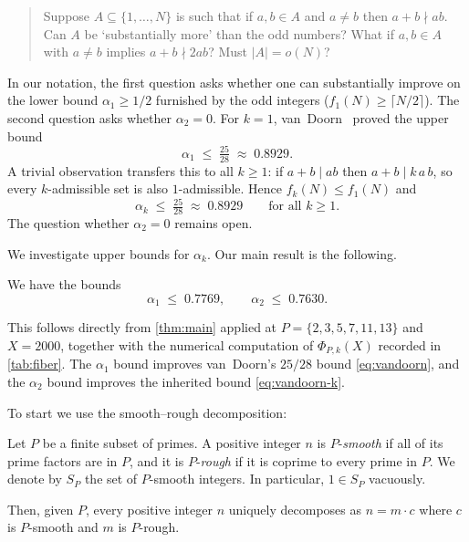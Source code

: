 \documentclass{amsart}
\begin{document}
\begin{quote}
Suppose $A \subseteq \{1, \ldots, N\}$ is such that if $a, b \in A$ and
$a \neq b$ then $a + b \nmid ab$. Can $A$ be `substantially more' than
the odd numbers? What if $a, b \in A$ with $a \neq b$ implies
$a + b \nmid 2ab$? Must $|A| = o(N)$?
\end{quote}

In our notation, the first question asks whether one can substantially improve on the lower bound $\alpha_1 \geq 1/2$ furnished by the odd integers ($f_1(N) \geq \lceil N/2 \rceil$). The second question asks whether $\alpha_2 = 0$.
For $k = 1$, van~Doorn~\cite{vanDoorn} proved the upper bound
\begin{equation}\label{eq:vandoorn}
\alpha_1 \;\leq\; \tfrac{25}{28} \;\approx\; 0.8929.
\end{equation}
A trivial observation transfers this to all $k \geq 1$: if $a + b \mid ab$ then $a + b \mid k\,a\,b$, so every $k$-admissible set is also $1$-admissible. Hence $f_k(N) \leq f_1(N)$ and
\begin{equation}\label{eq:vandoorn-k}
\alpha_k \;\leq\; \tfrac{25}{28} \;\approx\; 0.8929 \qquad \text{for all } k \geq 1.
\end{equation}
The question whether $\alpha_2 = 0$ remains open.

We investigate upper bounds for $\alpha_k$. Our main result is the following.

\begin{theorem}\label{thm:A} We have the bounds
\[
\alpha_1 \;\leq\; 0.7769, \qquad \alpha_2 \;\leq\; 0.7630.
\]
\end{theorem}
This follows directly from \cref{thm:main} applied at
$P = \{2, 3, 5, 7, 11, 13\}$ and $X = 2000$, together with the numerical
computation of $\Phi_{P, k}(X)$ recorded in \cref{tab:fiber}. The $\alpha_1$ bound improves van~Doorn's $25/28$ bound \eqref{eq:vandoorn}, and the $\alpha_2$ bound improves the inherited bound \eqref{eq:vandoorn-k}.

To start we use the smooth--rough decomposition:
\begin{definition}\label{def:P-smooth}
   Let $P$ be a finite subset of primes.
    A positive integer $n$ is $P$-\emph{smooth} if all of its prime factors are in $P$, and it is $P$-\emph{rough} if it is coprime to every prime in $P$. We denote by $S_P$ the set of $P$-smooth integers. In particular, $1 \in S_P$ vacuously.
\end{definition}

Then, given $P$, every positive integer $n$ uniquely decomposes as $n = m \cdot c$ where $c$ is $P$-smooth and $m$ is $P$-rough.
\end{document}

